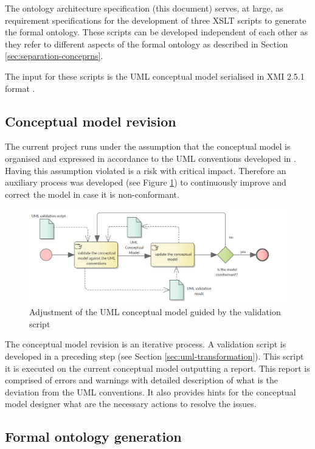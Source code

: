 	The ontology architecture specification (this document) serves, at large, as requirement specifications for the development of three XSLT scripts to generate the formal ontology. These scripts can be developed independent of each other as they refer to different aspects of the formal ontology as described in Section \ref{sec:separation-conceprns}.
	
	The input for these scripts is the UML conceptual model serialised in XMI 2.5.1 format \cite{xmi2.5.1}.
	
	\subsection{Conceptual model revision}
	\label{sec:revision-cm}
	
	The current project runs under the assumption that the conceptual model is organised and expressed in accordance to the UML conventions developed in \citet{costetchi2020b}. Having this assumption violated is a risk with critical impact. Therefore an auxiliary process was developed (see Figure \ref{fig:revision-cm}) to continuously improve and correct the model in case it is non-conformant. 
	
	\begin{figure}[!ht]	
		\centering
		\includegraphics[width=.85\textwidth]{../img/conceptualModelRevision.png}
		\caption{Adjustment of the UML conceptual model guided by the validation script}
		\label{fig:revision-cm}
	\end{figure}

	The conceptual model revision is an iterative process. A validation script is developed in a preceding step (see Section \ref{sec:uml-transformation}). This script it is executed on the current conceptual model outputting a report. This report is comprised of errors and warnings with detailed description of what is the deviation from the UML conventions. It also provides hints for the conceptual model designer what are the necessary actions to resolve the issues.
	
	\subsection{Formal ontology generation}
	\label{sec:ontology-generation}
	
